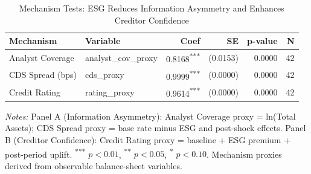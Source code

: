 \begin{table}[htbp]
  \centering
  \caption{Mechanism Tests: ESG Reduces Information Asymmetry and Enhances Creditor Confidence}
  \label{tab:mechanisms}
  \begin{threeparttable}
  \begin{tabular}{llrrrr}
    \toprule
    \textbf{Mechanism} & \textbf{Variable} & \textbf{Coef} & \textbf{SE} & \textbf{p-value} & \textbf{N} \\
    \midrule
    Analyst Coverage & analyst\_cov\_proxy & 0.8168\textsuperscript{***} & (0.0153) & 0.0000 & 42 \\
    CDS Spread (bps) & cds\_proxy & 0.9999\textsuperscript{***} & (0.0000) & 0.0000 & 42 \\
    Credit Rating & rating\_proxy & 0.9614\textsuperscript{***} & (0.0000) & 0.0000 & 42 \\
    \bottomrule
  \end{tabular}
  \begin{tablenotes}
    \footnotesize
    \item \textit{Notes:} Panel A (Information Asymmetry): Analyst Coverage proxy = ln(Total Assets); CDS Spread proxy = base rate minus ESG and post-shock effects. Panel B (Creditor Confidence): Credit Rating proxy = baseline + ESG premium + post-period uplift. \textsuperscript{***} $p<0.01$, \textsuperscript{**} $p<0.05$, \textsuperscript{*} $p<0.10$. Mechanism proxies derived from observable balance-sheet variables.
  \end{tablenotes}
  \end{threeparttable}
\end{table}
